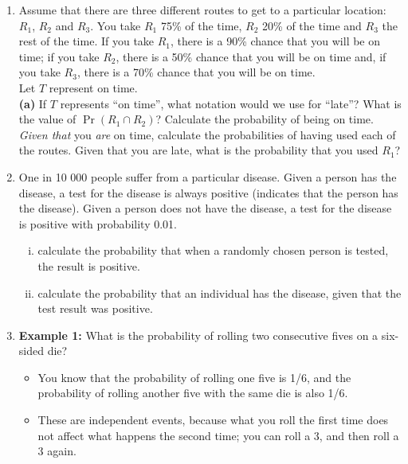 \documentclass[a4paper,12pt]{article}
\begin{document}
\begin{enumerate}
\begin{framed}
\begin{itemize}
\end{itemize}
\end{framed}

\item 
Assume that there are three different routes to get to a particular location: $R_1$, $R_2$ and $R_3$. You take $R_1$ 75\% of the time, $R_2$ 20\% of the time and $R_3$ the rest of the time. If you take $R_1$, there is a 90\% chance that you will be on time; if you take $R_2$, there is a 50\% chance that you will be on time and, if you take $R_3$, there is a 70\% chance that you will be on time. \\[0.1cm]
Let $T$ represent on time.\\[-0.2cm]

{\bf(a)} If $T$ represents ``on time'', what notation would we use for ``late''?  What is the value of $\Pr(R_1 \cap R_2)$?  Calculate the probability of being on time.  \emph{Given that} you \emph{are} on time, calculate the probabilities of having used each of the routes.  Given that you are late, what is the probability that you used $R_1$?

\item One in 10 000 people suffer from a particular disease. Given a person has the disease, a test for the disease is always positive (indicates that the person has the disease). Given a person does not have the disease, a test for the disease is positive with probability 0.01.
\begin{enumerate}[(i)]
\item calculate the probability that when a randomly chosen person is tested, the result is positive. 
\item calculate the probability that an individual has the disease, given that the test result was positive.
\end{enumerate}

\item \textbf{Example 1:} What is the probability of rolling two consecutive fives on a six-sided die?
\begin{itemize}
\item You know that the probability of rolling one five is 1/6, and the probability of rolling another five with the same die is also 1/6.
\item These are independent events, because what you roll the first time does not affect what happens the second time; you can roll a 3, and then roll a 3 again.
\end{itemize}


\end{enumerate}
\end{document}
